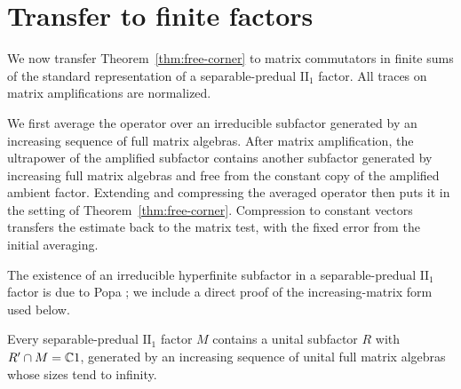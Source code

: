 \section{Transfer to finite factors}
\label{sec:finite-factors}

We now transfer Theorem~\ref{thm:free-corner} to matrix commutators in
finite sums of the standard representation of a separable-predual
\(\mathrm{II}_1\) factor.  All traces on matrix amplifications are normalized.

We first average the operator over an irreducible subfactor generated by
an increasing sequence of full matrix algebras. After matrix amplification,
the ultrapower of the amplified subfactor contains another subfactor
generated by increasing full matrix algebras and free from the constant
copy of the amplified ambient factor. Extending and compressing the
averaged operator then puts it in the setting of
Theorem~\ref{thm:free-corner}. Compression to constant vectors transfers
the estimate back to the matrix test, with the fixed error from the
initial averaging.

The existence of an irreducible hyperfinite subfactor in a
separable-predual \(\mathrm{II}_1\) factor is due to Popa
\citep{Popa1981}; we include a direct proof of the increasing-matrix
form used below.

\begin{lemma}
\label{lem:irreducible-hyperfinite}
Every separable-predual \(\mathrm{II}_1\) factor \(M\) contains a unital
subfactor \(R\) with \(R'\cap M=\mathbb C1\), generated by an increasing sequence
of unital full matrix algebras whose sizes tend to infinity.
\end{lemma}

